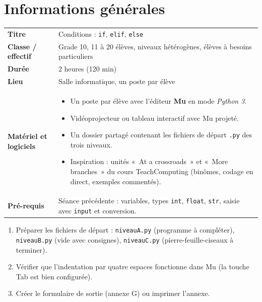 \documentclass[11pt,a4paper]{article}
\begin{document}

\section{Informations générales}
\begin{tabularx}{\linewidth}{>{\bfseries}p{3.6cm}Y}
\toprule
Titre & Conditions : \texttt{if}, \texttt{elif}, \texttt{else}\\
Classe / effectif & Grade 10, 11 à 20 élèves, niveaux hétérogènes, élèves à besoins particuliers\\
Durée & 2 heures (120 min)\\
Lieu & Salle informatique, un poste par élève\\
Matériel et logiciels &
\begin{itemize}
 \item Un poste par élève avec l'éditeur \textbf{Mu} en mode \emph{Python 3}.
 \item Vidéoprojecteur ou tableau interactif avec Mu projeté.
 \item Un dossier partagé contenant les fichiers de départ \texttt{.py} des trois niveaux.
 \item Inspiration : unités «~At a crossroads~» et «~More branches~» du cours TeachComputing (binômes, codage en direct, exemples commentés).
\end{itemize}\\
Pré-requis &
Séance précédente : variables, types \texttt{int}, \texttt{float}, \texttt{str}, saisie avec \texttt{input} et conversion.\\
\bottomrule
\end{tabularx}

\begin{astuce}
\begin{enumerate}
 \item Préparer les fichiers de départ : \texttt{niveauA.py} (programme à compléter), \texttt{niveauB.py} (vide avec consignes), \texttt{niveauC.py} (pierre-feuille-ciseaux à terminer).
 \item Vérifier que l'indentation par quatre espaces fonctionne dans Mu (la touche Tab est bien configurée).
 \item Créer le formulaire de sortie (annexe G) ou imprimer l'annexe.
\end{enumerate}
\end{astuce}
\end{document}
